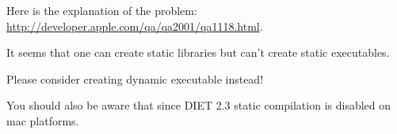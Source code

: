 \documentclass[12pt,a4paper]{book}
\begin{document}
Here is the explanation of the problem:
\url{http://developer.apple.com/qa/qa2001/qa1118.html}.

It seems that one can create static libraries but can't create static
executables.

Please consider creating dynamic executable instead!

You should also be aware that since DIET 2.3 static compilation is
disabled on mac platforms.
\end{document}
